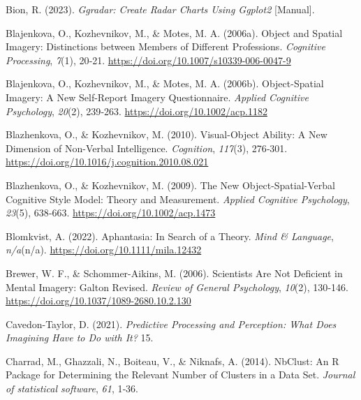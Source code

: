 \documentclass[
  12pt,
]{article}
\newlength{\cslhangindent}
\newlength{\cslentryspacingunit} %
\newenvironment{CSLReferences}[2] %
 {%
  \setlength{\parindent}{0pt}
  \ifodd #1
  \let\oldpar\par
  \def\par{\hangindent=\cslhangindent\oldpar}
  \fi
  \setlength{\parskip}{#2\cslentryspacingunit}
 }%
 {}
\begin{document}
\begin{CSLReferences}{1}{0}
\leavevmode{}%
Bion, R. (2023). \emph{Ggradar: {Create} Radar Charts Using Ggplot2}
{[}Manual{]}.

\leavevmode{}%
Blajenkova, O., Kozhevnikov, M., \& Motes, M. A. (2006a). Object and
Spatial Imagery: Distinctions between Members of Different Professions.
\emph{Cognitive Processing}, \emph{7}(1), 20‑21.
\url{https://doi.org/10.1007/s10339-006-0047-9}

\leavevmode{}%
Blajenkova, O., Kozhevnikov, M., \& Motes, M. A. (2006b). Object-Spatial
Imagery: A New Self-Report Imagery Questionnaire. \emph{Applied
Cognitive Psychology}, \emph{20}(2), 239‑263.
\url{https://doi.org/10.1002/acp.1182}

\leavevmode{}%
Blazhenkova, O., \& Kozhevnikov, M. (2010). Visual-Object Ability: {A}
New Dimension of Non-Verbal Intelligence. \emph{Cognition},
\emph{117}(3), 276‑301.
\url{https://doi.org/10.1016/j.cognition.2010.08.021}

\leavevmode{}%
Blazhenkova, O., \& Kozhevnikov, M. (2009). The New
Object-Spatial-Verbal Cognitive Style Model: {Theory} and Measurement.
\emph{Applied Cognitive Psychology}, \emph{23}(5), 638‑663.
\url{https://doi.org/10.1002/acp.1473}

\leavevmode{}%
Blomkvist, A. (2022). Aphantasia: {In} Search of a Theory. \emph{Mind \&
Language}, \emph{n/a}(n/a). \url{https://doi.org/10.1111/mila.12432}

\leavevmode{}%
Brewer, W. F., \& Schommer-Aikins, M. (2006). Scientists {Are Not
Deficient} in {Mental Imagery}: {Galton Revised}. \emph{Review of
General Psychology}, \emph{10}(2), 130‑146.
\url{https://doi.org/10.1037/1089-2680.10.2.130}

\leavevmode{}%
Cavedon-Taylor, D. (2021). \emph{Predictive {Processing} and
{Perception}: {What} Does {Imagining} Have to Do with It?} 15.

\leavevmode{}%
Charrad, M., Ghazzali, N., Boiteau, V., \& Niknafs, A. (2014).
{NbClust}: An {R} Package for Determining the Relevant Number of
Clusters in a Data Set. \emph{Journal of statistical software},
\emph{61}, 1‑36.


\end{CSLReferences}
\end{document}
